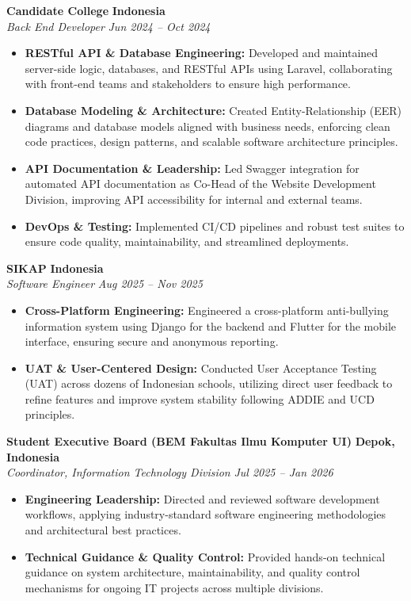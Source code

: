 \documentclass[letterpaper,10pt]{article}
\begin{document}
\noindent \textbf{\large Candidate College} \hfill \textbf{Indonesia} \\
\textit{Back End Developer} \hfill \textit{Jun 2024 -- Oct 2024}
\begin{itemize}
    \item \textbf{RESTful API \& Database Engineering:} Developed and maintained server-side logic, databases, and RESTful APIs using Laravel, collaborating with front-end teams and stakeholders to ensure high performance.
    \item \textbf{Database Modeling \& Architecture:} Created Entity-Relationship (EER) diagrams and database models aligned with business needs, enforcing clean code practices, design patterns, and scalable software architecture principles.
    \item \textbf{API Documentation \& Leadership:} Led Swagger integration for automated API documentation as Co-Head of the Website Development Division, improving API accessibility for internal and external teams.
    \item \textbf{DevOps \& Testing:} Implemented CI/CD pipelines and robust test suites to ensure code quality, maintainability, and streamlined deployments.
\end{itemize}
\vspace{2pt}

\noindent \textbf{\large SIKAP} \hfill \textbf{Indonesia} \\
\textit{Software Engineer} \hfill \textit{Aug 2025 -- Nov 2025}
\begin{itemize}
    \item \textbf{Cross-Platform Engineering:} Engineered a cross-platform anti-bullying information system using Django for the backend and Flutter for the mobile interface, ensuring secure and anonymous reporting.
    \item \textbf{UAT \& User-Centered Design:} Conducted User Acceptance Testing (UAT) across dozens of Indonesian schools, utilizing direct user feedback to refine features and improve system stability following ADDIE and UCD principles.
\end{itemize}
\vspace{2pt}

\noindent \textbf{\large Student Executive Board (BEM Fakultas Ilmu Komputer UI)} \hfill \textbf{Depok, Indonesia} \\
\textit{Coordinator, Information Technology Division} \hfill \textit{Jul 2025 -- Jan 2026}
\begin{itemize}
    \item \textbf{Engineering Leadership:} Directed and reviewed software development workflows, applying industry-standard software engineering methodologies and architectural best practices.
    \item \textbf{Technical Guidance \& Quality Control:} Provided hands-on technical guidance on system architecture, maintainability, and quality control mechanisms for ongoing IT projects across multiple divisions.
\end{itemize}
\vspace{2pt}
\end{document}
